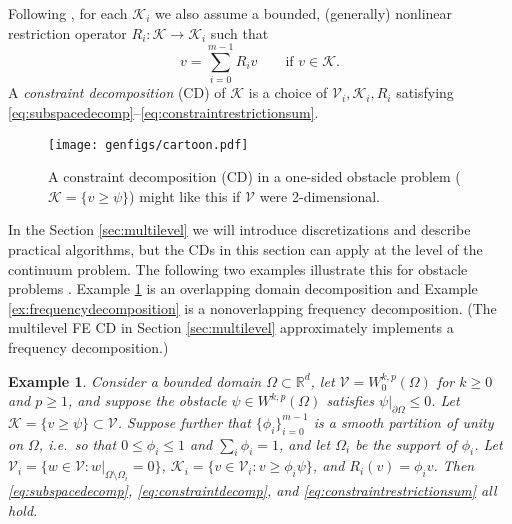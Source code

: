 \documentclass[letterpaper,final,12pt,reqno]{amsart}
\theoremstyle{cstyle}
\theoremstyle{cstyle*}
\theoremstyle{dstyle}
\newtheorem{example}[theorem]{Example}
\numberwithin{equation}{section}
\numberwithin{figure}{section}
\numberwithin{table}{section}
\numberwithin{theorem}{section}
\newcommand{\RR}{\mathbb{R}}
\newcommand{\cK}{\mathcal{K}}
\newcommand{\cV}{\mathcal{V}}
\begin{document}
Following \cite{Tai2003}, for each $\cK_i$ we also assume a bounded, (generally) nonlinear restriction operator $R_i : \cK \to \cK_i$ such that
\begin{equation}
v = \sum_{i=0}^{m-1} R_i v \qquad \text{if } v \in \cK.  \label{eq:constraintrestrictionsum}
\end{equation}
A \emph{constraint decomposition} (CD) of $\cK$ is a choice of $\cV_i,\cK_i,R_i$ satisfying \eqref{eq:subspacedecomp}--\eqref{eq:constraintrestrictionsum}.

\begin{figure}[h]
\texttt{[image: genfigs/cartoon.pdf]}
\caption{A constraint decomposition (CD) in a one-sided obstacle problem ($\mathcal{K}=\{v\ge \psi\}$) might like this if $\mathcal{V}$ were 2-dimensional.}
\label{fig:cartoon}
\end{figure}

In the Section \ref{sec:multilevel} we will introduce discretizations and describe practical algorithms, but the CDs in this section can apply at the level of the continuum problem.  The following two examples illustrate this for obstacle problems \cite{GraeserKornhuber2009}.   Example \ref{ex:domaindecomposition} is an overlapping domain decomposition and Example \ref{ex:frequencydecomposition} is a nonoverlapping frequency decomposition.  (The multilevel FE CD in Section \ref{sec:multilevel} approximately implements a frequency decomposition.)

\begin{example}  \label{ex:domaindecomposition}  Consider a bounded domain $\Omega \subset \RR^d$, let $\cV = W_0^{k,p}(\Omega)$ for $k\ge 0$ and $p\ge 1$, and suppose the obstacle $\psi \in W^{k,p}(\Omega)$ satisfies $\psi|_{\partial \Omega} \le 0$.  Let $\cK = \{v \ge \psi\} \subset \cV$.  Suppose further that $\{\phi_i\}_{i=0}^{m-1}$ is a smooth partition of unity on $\Omega$, i.e.~so that $0 \le \phi_i\le 1$ and $\sum_i \phi_i = 1$, and let $\Omega_i$ be the support of $\phi_i$.  Let $\cV_i = \{w \in \cV:w|_{\Omega \setminus \Omega_i} =0 \}$, $\cK_i = \{v \in \cV_i: v \ge \phi_i \psi\}$, and $R_i(v) = \phi_i v$.  Then \eqref{eq:subspacedecomp}, \eqref{eq:constraintdecomp}, and \eqref{eq:constraintrestrictionsum} all hold.
\end{example}

\end{document}
